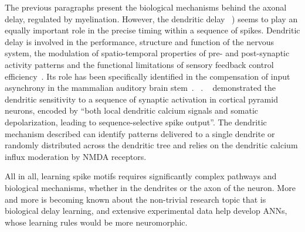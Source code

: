 \documentclass[brainsci, %
               review,accept,pdftex,moreauthors
               ]{Definitions/mdpi}
\begin{document}
The previous paragraphs present the biological mechanisms behind the axonal delay, regulated by myelination. However, the dendritic delay ~\citep{seidl_mechanisms_2010}) seems to play an equally important role in the precise timing within a sequence of spikes. Dendritic delay is involved in the performance, structure and function of the nervous system, the modulation of spatio-temporal properties of pre- and post-synaptic activity patterns and the functional limitations of sensory feedback control efficiency~\citep{madadi_asl_dendritic_2018}. Its role has been specifically identified in the compensation of input asynchrony in the mammalian auditory brain stem~\citep{spencer_compensation_2018}. \citet{mel_synaptic_2017} ~\citep{golding_dendritic_2002}. ~\citet{branco_dendritic_2010} demonstrated the dendritic sensitivity to a sequence of synaptic activation in cortical pyramid neurons, encoded by ``both local dendritic calcium signals and somatic depolarization, leading to sequence-selective spike output''. The dendritic mechanism described can identify patterns delivered to a single dendrite or randomly distributed across the dendritic tree and relies on the dendritic calcium influx moderation by NMDA receptors.

All in all, learning spike motifs requires significantly complex pathways and biological mechanisms, whether in the dendrites or the axon of the neuron. More and more is becoming known about the non-trivial research topic that is biological delay learning, and extensive experimental data help develop ANNs, whose learning rules would be more neuromorphic. 
%
\end{document}

